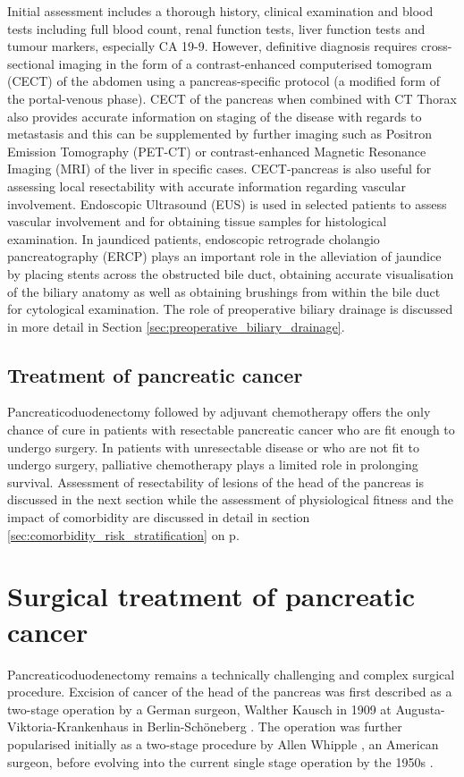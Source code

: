 Initial assessment includes a thorough history, clinical examination and blood tests including full blood count, renal function tests, liver function tests and tumour markers, especially CA 19-9. 
However, definitive diagnosis requires cross-sectional imaging in the form of a contrast-enhanced computerised tomogram (CECT) of the abdomen using a pancreas-specific protocol (a modified form of the portal-venous phase). 
CECT of the pancreas when combined with CT Thorax also provides accurate information on staging of the disease with regards to metastasis and this can be supplemented by further imaging such as Positron Emission Tomography (PET-CT) or contrast-enhanced Magnetic Resonance Imaging (MRI) of the liver in specific cases. 
CECT-pancreas is also useful for assessing local resectability with accurate information regarding vascular involvement. 
Endoscopic Ultrasound (EUS) is used in selected patients to assess vascular involvement and for obtaining tissue samples for histological examination. 
In jaundiced patients, endoscopic retrograde cholangio pancreatography (ERCP) plays an important role in the alleviation of jaundice by placing stents across the obstructed bile duct, obtaining accurate visualisation of the biliary anatomy as well as obtaining brushings from within the bile duct for cytological examination. 
The role of preoperative biliary drainage is discussed in more detail in Section \ref{sec:preoperative_biliary_drainage}.
	
\subsection{Treatment of pancreatic cancer}
Pancreaticoduodenectomy followed by adjuvant chemotherapy offers the only chance of cure in patients with resectable pancreatic cancer who are fit enough to undergo surgery. 
In patients with unresectable disease or who are not fit to undergo surgery, palliative chemotherapy plays a limited role in prolonging survival. 
Assessment of resectability of lesions of the head of the pancreas is discussed in the next section while the assessment of physiological fitness and the impact of comorbidity are discussed in detail in section \ref{sec:comorbidity_risk_stratification} on p\pageref{sec:comorbidity_risk_stratification}.

\section{Surgical treatment of pancreatic cancer}
Pancreaticoduodenectomy remains a technically challenging and complex surgical procedure.%
Excision of cancer of the head of the pancreas was first described as a two-stage operation by a German surgeon, Walther Kausch in 1909 at Augusta-Viktoria-Krankenhaus in Berlin-Schöneberg \parencite{kausch_carcinom_1912}. 
The operation was further popularised initially as a two-stage procedure by Allen Whipple \parencite{whipple_treatment_1935}, an American surgeon, before evolving into the current single stage operation by the 1950s \parencite{whipple_rationale_1941, whipple_radical_1950}.

